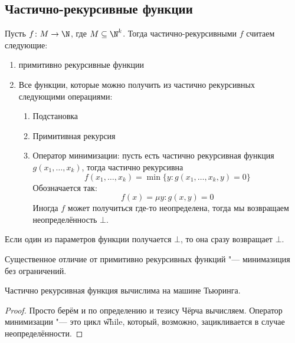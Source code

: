 \subsection{Частично-рекурсивные функции}
\begin{Def}
	Пусть $f \colon M \to \N$, где $M \subseteq \N^k$.
	Тогда частично-рекурсивными $f$ считаем следующие:
	\begin{enumerate}
	\item примитивно рекурсивные функции
	\item Все функции, которые можно получить из частично рекурсивных следующими операциями:
		\begin{enumerate}
		\item Подстановка
		\item Примитивная рекурсия
		\item Оператор минимизации: пусть есть частично рекурсивная функция $g(x_1, \dots, x_k)$,
			тогда частично рекурсивна
			\[ f(x_1, \dots, x_k) = \min \{ y \colon g(x_1, \dots, x_k, y) = 0 \} \]
			Обозначается так:
			\[ f(x) = \mu y \colon g(x, y) = 0 \]
			Иногда $f$ может получиться где-то неопределена, тогда мы возвращаем неопределённость $\bot$.
		\end{enumerate}
	\end{enumerate}
	Если один из параметров функции получается $\bot$, то она сразу возвращает $\bot$.
\end{Def}
\begin{Rem}
	Существенное отличие от примитивно рекурсивных функций "--- минимазиция без ограничений.
\end{Rem}
\begin{theorem}
	Частично рекурсивная функция вычислима на машине Тьюринга.
\end{theorem}
\begin{proof}
	Просто берём и по определению и тезису Чёрча вычисляем.
	Оператор минимизации "--- это цикл \t{while}, который, возможно, зацикливается в случае неопределённости.
\end{proof}

